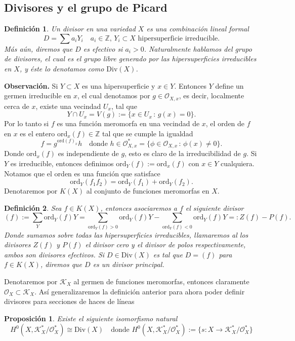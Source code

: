 \documentclass[letterpaper]{article}
\newtheorem{prop}[teorema]{Proposici\'on}
\newtheorem{def.}{Definici\'on}[section]
\newcommand{\zah}{\ensuremath{ \mathbb Z }}
\newcommand{\obs}{{\noindent \sc \textbf{Observación. }}}
\newcommand{\Div}{\ensuremath{\mathrm{Div}}}
\newcommand{\ord}{\ensuremath{\mathrm{ord}}}
\begin{document}
\subsection{Divisores y el grupo de Picard}
\begin{def.}
  Un  divisor en una variedad \(X\) es una combinación lineal formal
  \[
    D=\sum a_{i}Y_{i}\quad a_{i}\in\zah,\,Y_{i}\subset X \text{ hipersuperficie irreducible.}
  \]
\noindent Más aún, diremos que \(D\) es efectivo si \(a_{i}>0\). Naturalmente hablamos del grupo de divisores, el cual es el grupo libre generado por las hipersuperficies irreducibles en \(X\), y éste lo denotamos como \(\Div(X)\).
\end{def.}
\obs Si \(Y\subset X\) es una hipersuperficie y \(x\in Y\). Entonces \(Y\) define un germen irreducible en \(x\), el cual denotamos por \(g\in\mathcal{O}_{X,x}\), es decir, localmente cerca de \(x\), existe una vecindad \(U_{x}\), tal que
\[
  Y\cap U_{x}=V(g):=\{x\in U_{x}\,:\,g(x)=0\}.
\]
\noindent Por lo tanto si \(f\) es una función meromorfa en una vecindad de \(x\), el orden de \(f\) en \(x\) es el entero \(\ord_{x}(f)\in\zah\) tal que se cumple la igualdad
\[
  f=g^{\ord(f)_{x}}h\quad\text{donde }h\in\mathcal{O}^{*}_{X,x}=\{\phi\in\mathcal{O}_{X,x}\,:\,\phi(x)\neq0\}.
\]
\noindent Donde \(\ord_{x}(f)\) es independiente de \(g\), esto es claro de la irreducibilidad de \(g\). Si \(Y\) es irreducible, entonces definimos
\(\ord_{Y}(f):=\ord_{x}(f)\) con \(x\in Y\) cualquiera. Notamos que el orden es una función que satisface
\[
  \ord_{Y}(f_{1}f_{2})=\ord_{Y}(f_{1})+\ord_{Y}(f_{2}).
\]
Denotaremos por \(K(X)\) al conjunto de funciones meromorfas en \(X\).
\begin{def.}
  Sea \(f\in K(X)\), entonces asociaremos a \(f\) el siguiente divisor
  \[
    (f):=\sum_{Y}\ord_{Y}(f)Y=\sum_{\ord_{Y}(f)>0}\ord_{Y}(f)Y-\sum_{\ord_{Y}(f)<0}\ord_{Y}(f)Y=:Z(f)-P(f).
  \]
  \noindent Donde sumamos sobre todas las hipersuperficies irreducibles, llamaremos al los divisores \(Z(f)\) y \(P(f)\) \emph{el divisor cero} y \emph{el divisor de polos respectivamente}, ambos son divisores efectivos. Si \(D\in\Div(X)\) es tal que \(D=(f)\) para \(f\in K(X)\), diremos que \(D\) es un divisor \emph{principal}.
\end{def.}
Denotaremos por  \(\mathcal{K}_{X}\) al germen de funciones meromorfas, entonces claramente \(\mathcal{O}_{X}\subset\mathcal{K}_{X}\). Así generalizaremos la definición anterior para ahora poder definir divisores para secciones de haces de líneas
\begin{prop}
  Existe el siguiente isomorfismo natural
  \[
    H^{0}(X,\mathcal{K}^{*}_{X}/\mathcal{O}^{*}_{X})\cong\Div(X)\quad\text{donde }
    H^{0}(X,\mathcal{K}^{*}_{X}/\mathcal{O}^{*}_{X}):=\{s:X\rightarrow\mathcal{K}^{*}_{X}/\mathcal{O}^{*}_{X}\}
  \]
\end{prop}
\end{document}
